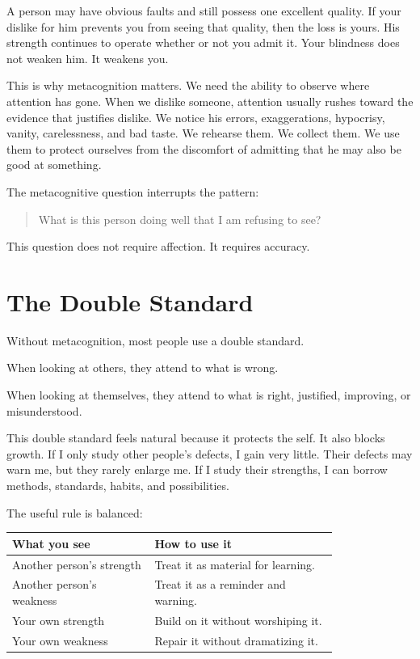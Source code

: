 A person may have obvious faults and still possess one excellent quality. If your dislike for him prevents you from seeing that quality, then the loss is yours. His strength continues to operate whether or not you admit it. Your blindness does not weaken him. It weakens you.

This is why metacognition matters. We need the ability to observe where attention has gone. When we dislike someone, attention usually rushes toward the evidence that justifies dislike. We notice his errors, exaggerations, hypocrisy, vanity, carelessness, and bad taste. We rehearse them. We collect them. We use them to protect ourselves from the discomfort of admitting that he may also be good at something.

The metacognitive question interrupts the pattern:

\begin{quote}
What is this person doing well that I am refusing to see?
\end{quote}

This question does not require affection. It requires accuracy.

\section*{The Double Standard}

Without metacognition, most people use a double standard.

When looking at others, they attend to what is wrong.

When looking at themselves, they attend to what is right, justified, improving, or misunderstood.

This double standard feels natural because it protects the self. It also blocks growth. If I only study other people's defects, I gain very little. Their defects may warn me, but they rarely enlarge me. If I study their strengths, I can borrow methods, standards, habits, and possibilities.

The useful rule is balanced:

\begin{center}
\begin{tabular}{p{0.35\linewidth}p{0.45\linewidth}}
\hline
What you see & How to use it \\
\hline
Another person's strength & Treat it as material for learning. \\
Another person's weakness & Treat it as a reminder and warning. \\
Your own strength & Build on it without worshiping it. \\
Your own weakness & Repair it without dramatizing it. \\
\hline
\end{tabular}
\end{center}

